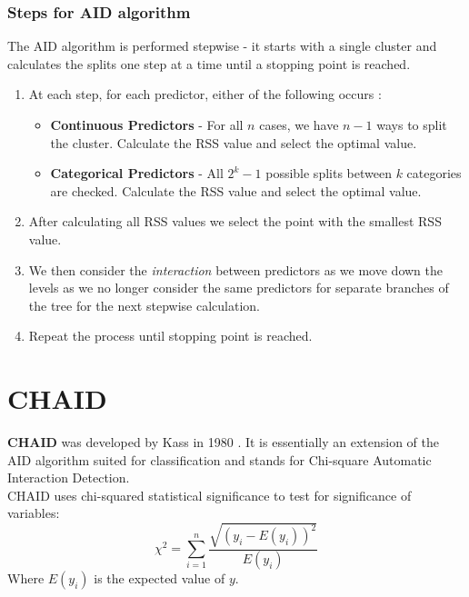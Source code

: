 \documentclass[11pt,a4paper]{report}
\begin{document}
\subsubsection{Steps for AID algorithm}
The AID algorithm is performed stepwise - it starts with a single cluster and calculates the splits one step at a time until a stopping point is reached. 
\begin{enumerate}
    \item At each step, for each predictor, either of the following occurs \cite{WilkinsonAID}:
    \begin{itemize}
        \item \textbf{Continuous Predictors} - For all $n$ cases, we have $n-1$ ways to split the cluster.
        Calculate the RSS value and select the optimal value.
    
        \item \textbf{Categorical Predictors} - All $2^{k} - 1$ possible splits between $k$ categories are checked.
        Calculate the RSS value and select the optimal value.
    \end{itemize}
    \item After calculating all RSS values we select the point with the          smallest RSS value.

    \item We then consider the \textit{interaction} between predictors as we move down the levels as we no longer consider the same predictors for separate branches of the tree for the next stepwise calculation.
    
    \item Repeat the process until stopping point is reached.
\end{enumerate}

\section{CHAID}
\textbf{CHAID} was developed by Kass in 1980 \cite{CHAID}.
It is essentially an extension of the AID algorithm suited for classification and stands for Chi-square Automatic Interaction Detection.\\
CHAID uses chi-squared statistical significance to test for significance of variables:
\begin{equation}
    \chi^{2} = \sum_{i = 1}^{n} \frac{\sqrt{(y_{i} - E(y_{i}))^2}}{E(y_{i})}
\end{equation}
Where $E(y_{i})$ is the expected value of $y$.
\end{document}
